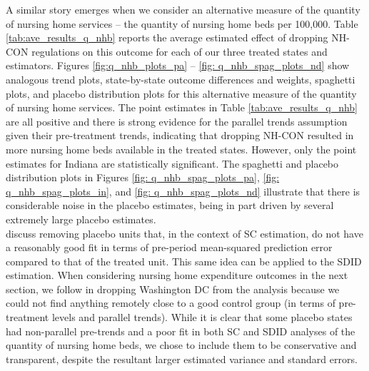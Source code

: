\documentclass[../Main.tex]{subfiles}
\begin{document}
\indent A similar story emerges when we consider an alternative measure of the quantity of nursing home services -- the quantity of nursing home beds per 100,000. Table \ref{tab:ave_results_q_nhb} reports the average estimated effect of dropping NH-CON regulations on this outcome for each of our three treated states and estimators. Figures \ref{fig:q_nhb_plots_pa} -- \ref{fig: q_nhb_spag_plots_nd} show analogous trend plots, state-by-state outcome differences and weights, spaghetti plots, and placebo distribution plots for this alternative measure of the quantity of nursing home services. The point estimates in Table \ref{tab:ave_results_q_nhb} are all positive and there is strong evidence for the parallel trends assumption given their pre-treatment trends, indicating that dropping NH-CON resulted in more nursing home beds available in the treated states. However, only the point estimates for Indiana are statistically significant. The spaghetti and placebo distribution plots in Figures \ref{fig: q_nhb_spag_plots_pa}, \ref{fig: q_nhb_spag_plots_in}, and \ref{fig: q_nhb_spag_plots_nd} illustrate that there is considerable noise in the placebo estimates, being in part driven by several extremely large placebo estimates.\\
\indent \citet{abadie2010synthetic} discuss removing placebo units that, in the context of SC estimation, do not have a reasonably good fit in terms of pre-period mean-squared prediction error compared to that of the treated unit. This same idea can be applied to the SDID estimation. When considering nursing home expenditure outcomes in the next section, we follow \citet{abadie2010synthetic} in dropping Washington DC from the analysis because we could not find anything remotely close to a good control group (in terms of pre-treatment levels and parallel trends). While it is clear that some placebo states had non-parallel pre-trends and a poor fit in both SC and SDID analyses of the quantity of nursing home beds, we chose to include them to be conservative and transparent, despite the resultant larger estimated variance and standard errors.
\end{document}
